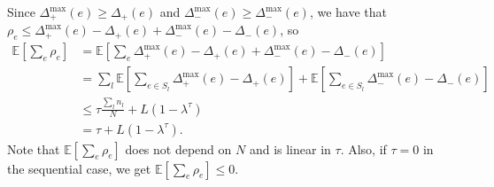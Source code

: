 Since $\Delta_+^{\max}(e) \geq \Delta_+(e)$ and $\Delta_-^{\max}(e) \geq \Delta_-^{\max}(e)$, we have that $\rho_e \leq \Delta_+^{\max}(e) - \Delta_+(e) + \Delta_-^{\max}(e) - \Delta_-(e)$, so
\begin{align*}
\mathbb{E}\left[\sum_e \rho_e\right]
&= \mathbb{E}\left[\sum_e \Delta_+^{\max}(e) - \Delta_+(e) + \Delta_-^{\max}(e) - \Delta_-(e) \right]\\
&= \sum_l \mathbb{E}\left[\sum_{e\in S_l} \Delta_+^{\max}(e) - \Delta_+(e)\right] + \mathbb{E}\left[\sum_{e\in S_l} \Delta_-^{\max}(e) - \Delta_-(e) \right]\\
&\leq \tau\frac{\sum_l n_l}{N} + L(1-\lambda^\tau)\\
&= \tau + L(1-\lambda^\tau).
\end{align*}
Note that $\mathbb{E}\left[\sum_e \rho_e\right]$ does not depend on $N$ and is linear in $\tau$.
Also, if $\tau=0$ in the sequential case, we get $\mathbb{E}\left[\sum_e \rho_e\right] \leq 0$.

